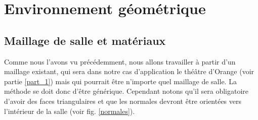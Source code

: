 









\section{Environnement géométrique}

\subsection{Maillage de salle et matériaux} \label{sect_lectMat}

Comme nous l'avons vu précédemment, nous allons travailler à partir d'un maillage existant, qui sera dans notre cas d'application le théâtre d'Orange (voir partie \ref{part_1}) mais qui pourrait être n'importe quel maillage de salle. La méthode se doit donc d'être générique. Cependant notons qu'il sera obligatoire d'avoir des faces triangulaires et que les normales devront être orientées vers l'intérieur de la salle (voir fig. \ref{normales}).


